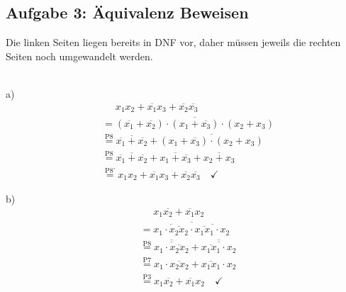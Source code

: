 \documentclass{article}
\newcommand{\nyet}{\overline}
\begin{document}
	\subsection*{Aufgabe 3: Äquivalenz Beweisen}
	Die linken Seiten liegen bereits in DNF vor, daher müssen jeweils die rechten Seiten noch umgewandelt werden.\\\\
	\begin{minipage}[t]{0.5\textwidth}
		a)
		\begin{align*}
			&\phantom{=} x_1x_2 + \nyet{x_1}x_3 + \nyet{x_2} \nyet{x_3} \\
			&= \nyet{(\nyet{x_1}+\nyet{x_2}) \cdot (x_1 + \nyet{x_3}) \cdot (x_2 + x_3)} \\
			&\stackrel{\text{P8}}{=} \nyet{\nyet{x_1}+\nyet{x_2}} + \nyet{(x_1 + \nyet{x_3}) \cdot (x_2 + x_3)} \\
			&\stackrel{\text{P8}}{=} \nyet{\nyet{x_1}+\nyet{x_2}} + \nyet{x_1 + \nyet{x_3}} + \nyet{x_2 + x_3} \\
			&\stackrel{\text{P8'}}{=} x_1 x_2 + \nyet{x_1} x_3 + \nyet{x_2} \nyet{x_3} \quad \checkmark
		\end{align*}
	\end{minipage}
	\begin{minipage}[t]{0.5\textwidth}
		b)
		\begin{align*}
			&\phantom{=} x_1 \nyet{x_2} + \nyet{x_1} x_2 \\
			&= \nyet{\nyet{x_1 \cdot \nyet{x_2 x_2}} \cdot \nyet{\nyet{x_1 x_1} \cdot x_2}} \\
			&\stackrel{\text{P8}}{=} \nyet{\nyet{x_1 \cdot \nyet{x_2 x_2}}} + \nyet{\nyet{\nyet{x_1 x_1} \cdot x_2}} \\
			&\stackrel{\text{P7}}{=} x_1 \cdot \nyet{x_2 x_2} + \nyet{x_1 x_1} \cdot x_2 \\
			&\stackrel{\text{P3}}{=} x_1 \nyet{x_2} + \nyet{x_1} x_2  \quad \checkmark
		\end{align*}
	\end{minipage}
\end{document}
